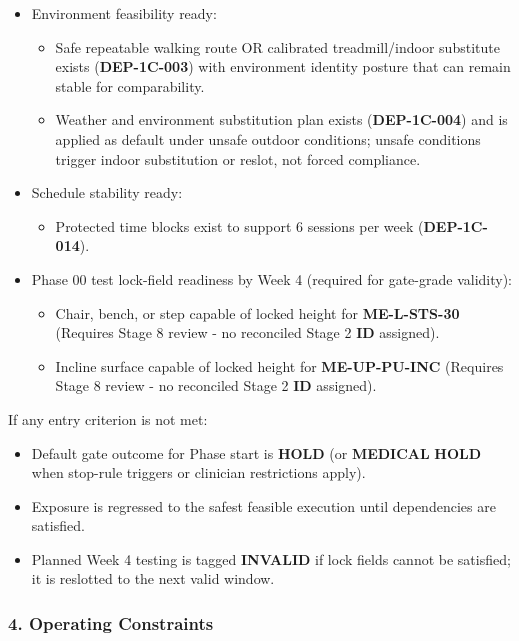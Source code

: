 \documentclass[10pt]{article}
\begin{document}
\begin{itemize}
\item Environment feasibility ready:
  \begin{itemize}
  \item Safe repeatable walking route OR calibrated treadmill/indoor substitute exists (\textbf{DEP-1C-003}) with environment identity posture that can remain stable for comparability.
  \item Weather and environment substitution plan exists (\textbf{DEP-1C-004}) and is applied as default under unsafe outdoor conditions; unsafe conditions trigger indoor substitution or reslot, not forced compliance.
  \end{itemize}

\item Schedule stability ready:
  \begin{itemize}
  \item Protected time blocks exist to support 6 sessions per week (\textbf{DEP-1C-014}).
  \end{itemize}

\item Phase 00 test lock-field readiness by Week 4 (required for gate-grade validity):
  \begin{itemize}
  \item Chair, bench, or step capable of locked height for \textbf{ME-L-STS-30} (Requires Stage 8 review - no reconciled Stage 2 \textbf{ID} assigned).
  \item Incline surface capable of locked height for \textbf{ME-UP-PU-INC} (Requires Stage 8 review - no reconciled Stage 2 \textbf{ID} assigned).
  \end{itemize}
\end{itemize}

If any entry criterion is not met:

\begin{itemize}
\item Default gate outcome for Phase start is \textbf{HOLD} (or \textbf{MEDICAL} \textbf{HOLD} when stop-rule triggers or clinician restrictions apply).
\item Exposure is regressed to the safest feasible execution until dependencies are satisfied.
\item Planned Week 4 testing is tagged \textbf{INVALID} if lock fields cannot be satisfied; it is reslotted to the next valid window.
\end{itemize}

\subsubsection*{4. Operating Constraints}
\end{document}
